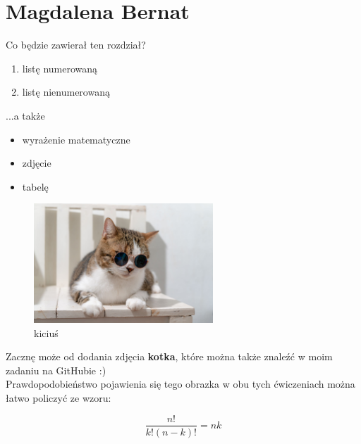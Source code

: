 \section{Magdalena Bernat}
\label{sec:magdabernat}
\noindent Co będzie zawierał ten rozdział?

\begin{enumerate}
  \item listę numerowaną
  \item listę nienumerowaną
\end{enumerate}

\noindent ...a także

\begin{itemize}
  \item wyrażenie matematyczne
  \item zdjęcie
  \item tabelę
\end{itemize}


\begin{figure}[htbp]
    \centering
    \includegraphics[width=0.6\textwidth]{pictures/cat.jpg}
    \caption{kiciuś}
    \label{fig:kiciuś}
\end{figure}

\noindent Zacznę może od dodania zdjęcia \textbf{kotka}, które można także znaleźć w moim zadaniu na GitHubie :)\\
\noindent Prawdopodobieństwo pojawienia się tego obrazka w obu tych ćwiczeniach można łatwo policzyć ze wzoru:

$$\frac{n!}{k!(n-k)!} = {n}{k}$$




